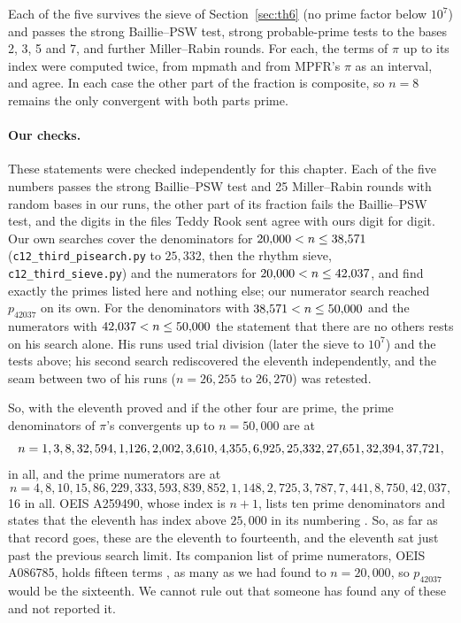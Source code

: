 Each of the five survives the sieve of Section~\ref{sec:th6} (no prime factor below $10^7$) and passes the strong Baillie--PSW test, strong probable-prime tests to the bases 2, 3, 5 and 7, and further Miller--Rabin rounds. For each, the terms of $\pi$ up to its index were computed twice, from mpmath and from MPFR's $\pi$ as an interval, and agree. In each case the other part of the fraction is composite, so $n = 8$ remains the only convergent with both parts prime.

{\sloppy\paragraph{Our checks.} These statements were checked independently for this chapter. Each of the five numbers passes the strong Baillie--PSW test and 25 Miller--Rabin rounds with random bases in our runs, the other part of its fraction fails the Baillie--PSW test, and the digits in the files Teddy Rook sent agree with ours digit for digit. Our own searches cover the denominators for $20{,}000 < n \le 38{,}571$ (\texttt{c12\_third\_pisearch.py} to $25{,}332$, then the rhythm sieve, \texttt{c12\_third\_sieve.py}) and the numerators for $20{,}000 < n \le 42{,}037$, and find exactly the primes listed here and nothing else; our numerator search reached $p_{42037}$ on its own. For the denominators with $38{,}571 < n \le 50{,}000$ and the numerators with $42{,}037 < n \le 50{,}000$ the statement that there are no others rests on his search alone. His runs used trial division (later the sieve to $10^7$) and the tests above; his second search rediscovered the eleventh independently, and the seam between two of his runs ($n = 26{,}255$ to $26{,}270$) was retested.\par}

So, with the eleventh proved and if the other four are prime, the prime denominators of $\pi$'s convergents up to $n = 50{,}000$ are at
\[
  n = 1, 3, 8, 32, 594, 1{,}126, 2{,}002, 3{,}610, 4{,}355, 6{,}925, 25{,}332, 27{,}651, 32{,}394, 37{,}721,
\]
\FoQn{} in all, and the prime numerators are at
\[
  n = 4, 8, 10, 15, 86, 229, 333, 593, 839, 852, 1{,}148, 2{,}725, 3{,}787, 7{,}441, 8{,}750, 42{,}037,
\]
16 in all. OEIS A259490, whose index is $n + 1$, lists ten prime denominators and states that the eleventh has index above $25{,}000$ in its numbering \citep{OEIS_A259490}. So, as far as that record goes, these are the eleventh to fourteenth, and the eleventh sat just past the previous search limit. Its companion list of prime numerators, OEIS A086785, holds fifteen terms \citep{OEIS_A086785}, as many as we had found to $n = 20{,}000$, so $p_{42037}$ would be the sixteenth. We cannot rule out that someone has found any of these and not reported it.

